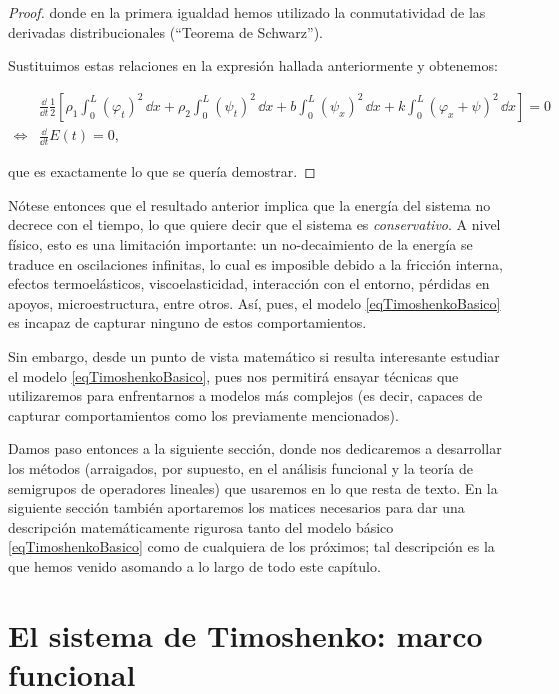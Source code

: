 \begin{proof}
    donde en la primera igualdad hemos utilizado la conmutatividad de las derivadas distribucionales (``Teorema de Schwarz'').

    Sustituimos estas relaciones en la expresión hallada anteriormente y obtenemos:

    \begin{align*}
        &\frac{\dd}{\dd t}\frac{1}{2}\left [\rho_1 \int_0^L(\varphi_t)^2 \, \dd x + \rho_2 \int_0^L (\psi_t)^2 \, \dd x + b\int_0^L (\psi_x)^2 \, \dd x + k \int_0^L (\varphi_x + \psi)^2 \, \dd x \right] = 0\\
        \iff&\frac{\dd}{\dd t}E(t) = 0,
    \end{align*}

    que es exactamente lo que se quería demostrar.
\end{proof}

Nótese entonces que el resultado anterior implica que la energía del sistema no decrece con el tiempo, lo que quiere decir que el sistema es \textit{conservativo}. A nivel físico, esto es una limitación importante: un no-decaimiento de la energía se traduce en oscilaciones infinitas, lo cual es imposible debido a la fricción interna, efectos termoelásticos, viscoelasticidad, interacción con el entorno, pérdidas en apoyos, microestructura, entre otros. Así, pues, el modelo \eqref{eqTimoshenkoBasico} es incapaz de capturar ninguno de estos comportamientos.

Sin embargo, desde un punto de vista matemático si resulta interesante estudiar el modelo \eqref{eqTimoshenkoBasico}, pues nos permitirá ensayar técnicas que utilizaremos para enfrentarnos a modelos más complejos (es decir, capaces de capturar comportamientos como los previamente mencionados). 

Damos paso entonces a la siguiente sección, donde nos dedicaremos a desarrollar los métodos (arraigados, por supuesto, en el análisis funcional y la teoría de semigrupos de operadores lineales) que usaremos en lo que resta de texto. En la siguiente sección también aportaremos los matices necesarios para dar una descripción matemáticamente rigurosa tanto del modelo básico \eqref{eqTimoshenkoBasico} como de cualquiera de los próximos; tal descripción es la que hemos venido asomando a lo largo de todo este capítulo.

\section{El sistema de Timoshenko: marco funcional}
\label{ch:teoriaVigas:section:timoshenkoFunc}


